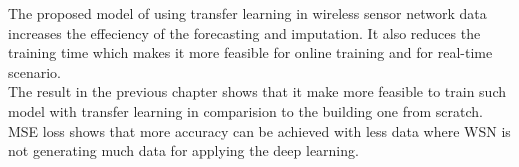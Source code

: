 The proposed model of using transfer learning in wireless sensor network data increases the effeciency of the forecasting and imputation. It also reduces the training time which makes it more feasible for online training and for real-time scenario.\\

The result in the previous chapter shows that it make more feasible to train such model with transfer learning in comparision to the building one from scratch. MSE loss shows that more accuracy can be achieved with less data where WSN is not generating much data for applying the deep learning.